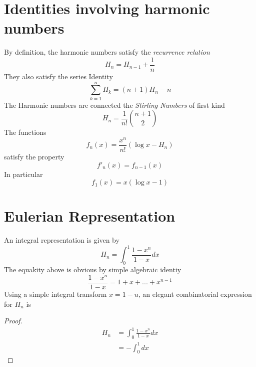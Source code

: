 \documentclass{article}
\begin{document}
\section{Identities involving harmonic numbers}
By definition, the harmonic numbers satisfy the \emph{recurrence relation}
\begin{equation} 
H_{n}=H_{n-1}+\frac{1}{n} \label{recurrence relation}
\end{equation}
They also satisfy the series Identity
\begin{equation}
\sum_{k=1}^n H_{k} = (n+1) H_{n} - n \label{Series Identity}
\end{equation}
The Harmonic numbers are connected the \emph{Stirling Numbers} of first kind
\begin{equation}
H_{n} = \frac{1}{n!} {n+1 \choose 2} \label{Stirling Identity}
\end{equation}
The functions
\begin{equation}
f_{n} (x) = \frac{x^n}{n!} (\log{x}-H_{n})
\end{equation}
satisfy the property
\begin{equation}
{f'}_{n} (x) = f_{n-1} (x)
\end{equation}
In particular
\begin{equation}
f_{1} (x) = x(\log{x}-1)       			
\end{equation}
\section{Eulerian Representation}
An integral representation is given by
\begin{equation}
H_{n} = \int_{0}^{1} \frac{1-x^n}{1-x} dx \label{Euler equation}
\end{equation}
The equakity above is obvious by simple algebraic identiy
\begin{equation}
\frac{1-x^n}{1-x} = 1+x+...+x^{n-1}
\end{equation}
Using a simple integral transform ${x = 1-u}$, an elegant combinatorial expression for $H_{n}$ is
\begin{proof}
\begin{align*}
H_{n} &= \int_{0}^{1} \frac{1-x^n}{1-x} dx \\
	 &= -\int_{0}^{1} dx
\end{align*}
\end{proof}
\end{document}
